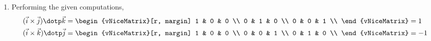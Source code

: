 \begin{enumerate}
    \item Performing the given computations,
          \begin{align}
              (\vec{i} \times \vec{j}) \dotp \vec{k} & =
              \begin{vNiceMatrix}[r, margin]
                  1 & 0 & 0 \\
                  0 & 1 & 0 \\
                  0 & 0 & 1 \\
              \end{vNiceMatrix} = 1              \\
              (\vec{i} \times \vec{k}) \dotp \vec{j} & =
              \begin{vNiceMatrix}[r, margin]
                  1 & 0 & 0 \\
                  0 & 0 & 1 \\
                  0 & 1 & 0 \\
              \end{vNiceMatrix} = -1              \\
          \end{align}


\end{enumerate}
